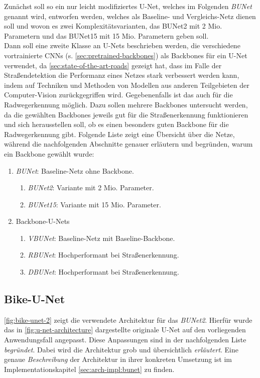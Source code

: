 Zunächst soll so ein nur leicht modifiziertes U-Net, welches im Folgenden \textit{\acf{BUNet}} 
genannt wird, entworfen werden, welches als Baseline- und Vergleichs-Netz dienen soll und 
wovon es zwei Komplexitätsvarianten, das \ac{BUNet2} mit 2 Mio. Parametern und das \ac{BUNet15} 
mit 15 Mio. Parametern geben soll. \\
Dann soll eine zweite Klasse an U-Nets beschrieben werden, die verschiedene vortrainierte \acp{CNN} (s. \autoref{sec:pretrained-backbones}) 
als Backbones für ein U-Net verwendet, da \autoref{sec:state-of-the-art-roads} gezeigt hat, 
dass im Falle der Straßendetektion die Performanz eines Netzes stark verbessert werden kann, 
indem auf Techniken und Methoden von Modellen aus anderen Teilgebieten der Computer-Vision 
zurückgegriffen wird. 
Gegebenenfalls ist das auch für die Radwegerkennung möglich. Dazu sollen mehrere Backbones untersucht werden, 
da die gewählten Backbones jeweils gut für die Straßenerkennung funktionieren und sich 
herausstellen soll, ob es einen besonders guten Backbone für die Radwegerkennung gibt. 
Folgende Liste zeigt eine Übersicht über die Netze, während die nachfolgenden Abschnitte genauer
erläutern und begründen, warum ein Backbone gewählt wurde: 
\begin{enumerate}
	\item \textit{\acf{BUNet}}: Baseline-Netz ohne Backbone.
	\begin{enumerate}
		\item \textit{\acf{BUNet2}}: Variante mit 2 Mio. Parameter.
		\item \textit{\acf{BUNet15}}: Variante mit 15 Mio. Parameter.
	\end{enumerate}
	\item Backbone-U-Nets
	\begin{enumerate}
		\item \textit{\acf{VBUNet}}: Baseline-Netz mit Baseline-Backbone.
		\item \textit{\acf{RBUNet}}: Hochperformant bei Straßenerkennung.
		\item \textit{\acf{DBUNet}}: Hochperformant bei Straßenerkennung.
	\end{enumerate}
\end{enumerate} 

\subsection{Bike-U-Net} \label{sec:architecture:bike-u-net}

\autoref{fig:bike-unet-2} zeigt die verwendete Architektur für das \textit{\ac{BUNet2}}. 
Hierfür wurde das in \autoref{fig:u-net-architecture} 
dargestellte originale U-Net auf den vorliegenden Anwendungsfall angepasst.
Diese Anpassungen sind in der nachfolgenden Liste \textit{begründet}. Dabei wird die Architektur grob und übersichtlich \textit{erläutert}. 
Eine genaue \textit{Beschreibung} der Architektur in ihrer konkreten Umsetzung 
ist im Implementationskapitel \autoref{sec:arch-impl:bunet} zu finden.  

